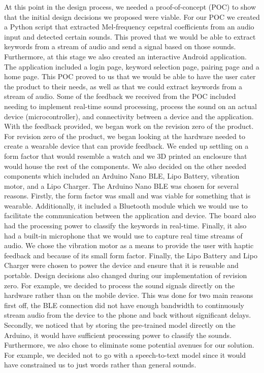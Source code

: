 \documentclass{article}
\begin{document}
\newline
\newline At this point in the design process, we needed a proof-of-concept (POC) to show that the initial design decisions we proposed were viable. For our POC we created a Python script that extracted Mel-frequency cepstral coefficients from an audio input and detected certain sounds. This proved that we would be able to extract keywords from a stream of audio and send a signal based on those sounds. Furthermore, at this stage we also created an interactive Android application. The application included a login page, keyword selection page, pairing page and a home page. This POC proved to us that we would be able to have the user cater the product to their needs, as well as that we could extract keywords from a  stream of audio. Some of the feedback we received from the POC included needing to implement real-time sound processing, process the sound on an actual device (microcontroller), and connectivity between a device and the application. With the feedback provided, we began work on the revision zero of the product.
\newline
\newline For revision zero of the product, we began looking at the hardware needed to create a wearable device that can provide feedback. We ended up settling on a form factor that would resemble a watch and we 3D printed an enclosure that would house the rest of the components. We also decided on the other needed components which included an Arduino Nano BLE, Lipo Battery, vibration motor, and a Lipo Charger. The Arduino Nano BLE was chosen for several reasons. Firstly, the form factor was small and was viable for something that is wearable. Additionally, it included a Bluetooth module which we would use to facilitate the communication between the application and device. The board also had the processing power to classify the keywords in real-time. Finally, it also had a built-in microphone that we would use to capture real time streams of audio. We chose the vibration motor as a means to provide the user with haptic feedback and because of its small form factor. Finally, the Lipo Battery and Lipo Charger were chosen to power the device and ensure that it is reusable and portable.
Design decisions also changed during our implementation of revision zero. For example, we decided to process the sound signals directly on the hardware rather than on the mobile device. This was done for two main reasons first off, the BLE connection did not have enough bandwidth to continuously stream audio from the device to the phone and back without significant delays. Secondly, we noticed that by storing the pre-trained model directly on the Arduino, it would have sufficient processing power to classify the sounds. Furthermore, we also chose to eliminate some potential avenues for our solution. For example, we decided not to go with a speech-to-text model since it would have constrained us to just words rather than general sounds.  
\end{document}
